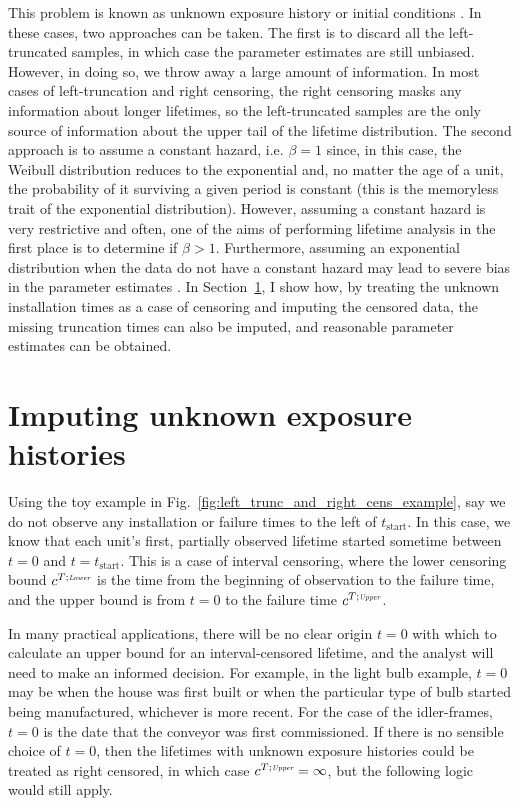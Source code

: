 This problem is known as unknown exposure history or initial conditions \citep{guo1993}. In these cases, two approaches can be taken. The first is to discard all the left-truncated samples, in which case the parameter estimates are still unbiased. However, in doing so, we throw away a large amount of information. In most cases of left-truncation and right censoring, the right censoring masks any information about longer lifetimes, so the left-truncated samples are the only source of information about the upper tail of the lifetime distribution. The second approach is to assume a constant hazard, i.e. $\beta = 1$ since, in this case, the Weibull distribution reduces to the exponential and, no matter the age of a unit, the probability of it surviving a given period is constant (this is the memoryless trait of the exponential distribution). However, assuming a constant hazard is very restrictive and often, one of the aims of performing lifetime analysis in the first place is to determine if $\beta > 1$. Furthermore, assuming an exponential distribution when the data do not have a constant hazard may lead to severe bias in the parameter estimates \citep{heckman1986}. In Section~\ref{sec:lt-imputation}, I show how, by treating the unknown installation times as a case of censoring and imputing the censored data, the missing truncation times can also be imputed, and reasonable parameter estimates can be obtained.

\section{Imputing unknown exposure histories} \label{sec:lt-imputation}

Using the toy example in Fig.~\ref{fig:left_trunc_and_right_cens_example}, say we do not observe any installation or failure times to the left of $t_\text{start}$. In this case, we know that each unit's first, partially observed lifetime started sometime between $t = 0$ and $t = t_\text{start}$. This is a case of interval censoring, where the lower censoring bound $c^{T;\textit{\tiny{Lower}}}$ is the time from the beginning of observation to the failure time, and the upper bound is from $t = 0$ to the failure time $c^{T;\textit{\tiny{Upper}}}$. 

In many practical applications, there will be no clear origin $t = 0$ with which to calculate an upper bound for an interval-censored lifetime, and the analyst will need to make an informed decision. For example, in the light bulb example, $t = 0$ may be when the house was first built or when the particular type of bulb started being manufactured, whichever is more recent. For the case of the idler-frames, $t = 0$ is the date that the conveyor was first commissioned. If there is no sensible choice of $t = 0$, then the lifetimes with unknown exposure histories could be treated as right censored, in which case $c^{T;\textit{\tiny{Upper}}} = \infty$, but the following logic would still apply.

